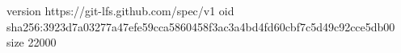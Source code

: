 version https://git-lfs.github.com/spec/v1
oid sha256:3923d7a03277a47efe59cca5860458f3ac3a4bd4fd60cbf7c5d49c92cce5db00
size 22000
